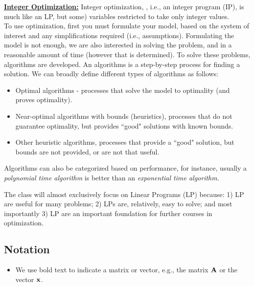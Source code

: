 \underline{\bf Integer Optimization:} Integer optimization, , i.e., an integer program (IP), is much like an LP, but some) variables restricted to take only integer values. \\
 



\bigskip To use optimization, first you must formulate your model, based on the system of interest and any simplifications required (i.e., assumptions).  Formulating the model is not enough, we are also interested in solving the problem, and in a reasonable amount of time (however that is determined). To solve these problems, algorithms are developed.  An algorithms is a step-by-step process for finding a solution.  We can broadly define different types of algorithms as follows:
\begin{itemize}
\item Optimal algorithms - processes that solve the model to optimality (and proves optimality).
\item Near-optimal algorithms with bounds (heuristics), processes that do not guarantee optimality, but provides ``good" solutions with known bounds.
\item Other heuristic algorithms, processes that provide a ``good" solution, but bounds are not provided, or are not that useful.
\end{itemize}

Algorithms can also be categorized based on performance, for instance, usually a {\it polynomial time algorithm} is better than an {\it exponential time algorithm}.

\bigskip The class will almost exclusively focus on Linear Programs (LP) because: 1) LP are useful for many problems; 2) LPs are, relatively, easy to solve; and most importantly 3) LP are an important foundation for further courses in optimization.

\subsection{Notation}

\begin{itemize}
\item We use bold text to indicate a matrix or vector, e.g., the matrix ${\bf A}$ or the vector ${\bf x}$.
\end{itemize}